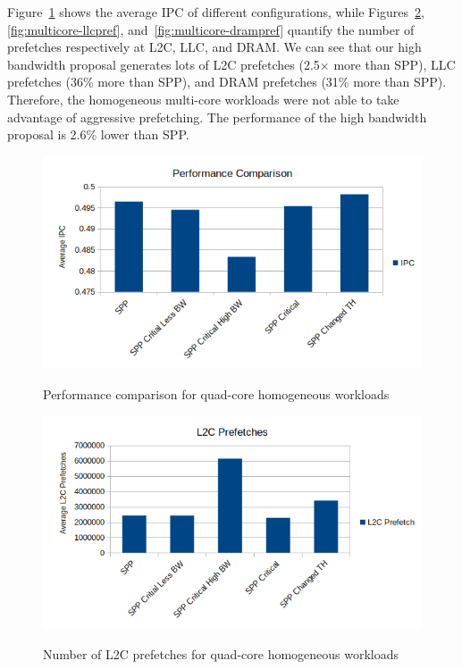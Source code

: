 Figure~\ref{fig:multicore-ipc} shows the average IPC of different configurations, while Figures~\ref{fig:multicore-l2cpref}, \ref{fig:multicore-llcpref}, and~\ref{fig:multicore-drampref} quantify the number of prefetches respectively at L2C, LLC, and DRAM.
We can see that our high bandwidth proposal generates lots of L2C prefetches (2.5$\times$ more than SPP), LLC prefetches (36\% more than SPP), and DRAM prefetches (31\% more than SPP). Therefore, the homogeneous multi-core workloads were not able to take advantage of aggressive prefetching. The performance of the high bandwidth proposal is 2.6\% lower than SPP.
\begin{figure}[H]
{\includegraphics[scale=0.7]{images/IPC_Homo.png}}
\caption{Performance comparison for quad-core homogeneous workloads}
\label{fig:multicore-ipc}
\end{figure}
\begin{figure}[H]
{\includegraphics[scale=0.7]{images/L2C_Homo.png}}
\caption{Number of L2C prefetches for quad-core homogeneous workloads}
\label{fig:multicore-l2cpref}
\end{figure}

